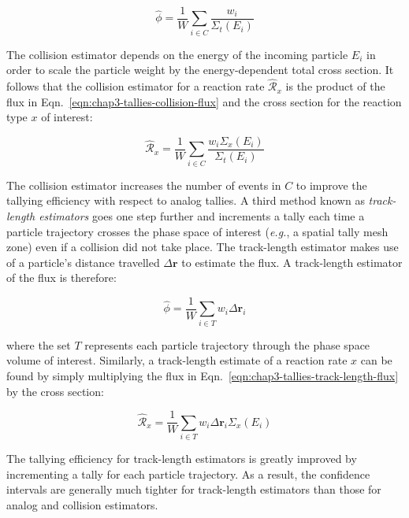 \begin{dmath}
\label{eqn:chap3-tallies-collision-flux}
\hat{\phi} = \frac{1}{W}\displaystyle\sum\limits_{i \in C}\frac{w_{i}}{\Sigma_{t}(E_{i})}
\end{dmath}

\noindent The collision estimator depends on the energy of the incoming particle $E_{i}$ in order to scale the particle weight by the energy-dependent total cross section. It follows that the collision estimator for a reaction rate $\hat{\mathcal{R}}_{x}$ is the product of the flux in Eqn.~\ref{eqn:chap3-tallies-collision-flux} and the cross section for the reaction type $x$ of interest:

\begin{dmath}
\label{eqn:chap3-tallies-collision-rxn}
\hat{\mathcal{R}}_{x} = \frac{1}{W}\displaystyle\sum\limits_{i \in C}\frac{w_{i}\Sigma_{x}(E_{i})}{\Sigma_{t}(E_{i})}
\end{dmath}

The collision estimator increases the number of events in $C$ to improve the tallying efficiency with respect to analog tallies. A third method known as \textit{track-length estimators} goes one step further and increments a tally each time a particle trajectory crosses the phase space of interest (\textit{e.g.}, a spatial tally mesh zone) even if a collision did not take place. The track-length estimator makes use of a particle's distance travelled $\Delta\mathbf{r}$ to estimate the flux. A track-length estimator of the flux is therefore:

\begin{dmath}
\label{eqn:chap3-tallies-track-length-flux}
  \hat{\phi} = \frac{1}{W}\displaystyle\sum\limits_{i \in T}w_{i}\Delta\mathbf{r}_{i}
\end{dmath}

\noindent where the set $T$ represents each particle trajectory through the phase space volume of interest. Similarly, a track-length estimate of a reaction rate $x$ can be found by simply multiplying the flux in Eqn.~\ref{eqn:chap3-tallies-track-length-flux} by the cross section:

\begin{dmath}
\label{eqn:chap3-tallies-track-length-rxn}
  \hat{\mathcal{R}}_{x} = \frac{1}{W}\displaystyle\sum\limits_{i \in T}w_{i}\Delta\mathbf{r}_{i}\Sigma_{x}(E_{i})
\end{dmath}

The tallying efficiency for track-length estimators is greatly improved by incrementing a tally for each particle trajectory. As a result, the confidence intervals are generally much tighter for track-length estimators than those for analog and collision estimators. 

